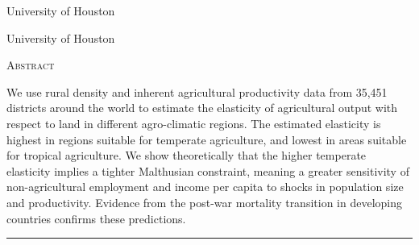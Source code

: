 \documentclass[11pt]{article}
\begin{document}
\begin{titlepage}
\vspace{2in} \noindent {\large \today}

\vspace{.5in} 

\vspace{.25in} 

\vspace{.05in} \noindent University of Houston

\vspace{.25in} 

\vspace{.05in} \noindent University of Houston

\vfill \noindent \textsc{Abstract} \hrulefill

\vspace{.05in} \noindent We use rural density and inherent agricultural productivity data from 35,451 districts around the world to estimate the elasticity of agricultural output with respect to land in different agro-climatic regions. The estimated elasticity is highest in regions suitable for temperate agriculture, and lowest in areas suitable for tropical agriculture. We show theoretically that the higher temperate elasticity implies a tighter Malthusian constraint, meaning a greater sensitivity of non-agricultural employment and income per capita to shocks in population size and productivity. Evidence from the post-war mortality transition in developing countries confirms these predictions.

\vspace{.1in} \hrule

\vspace{.5in} 

\vspace{.1in} 

\vspace{.1in} 
\end{titlepage}
\end{document}
